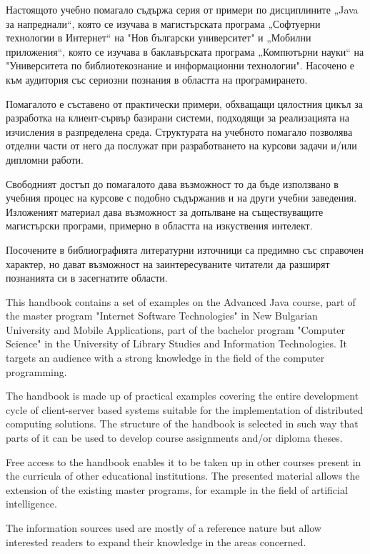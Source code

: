 Настоящото учебно помагало съдържа серия от примери по дисциплините „Java за напреднали“, която се изучава в магистърската програма „Софтуерни технологии в Интернет“ на "Нов български университет" и „Мобилни приложения“, която се изучава в баклавърската програма „Компютърни науки“ на "Университета по библиотекознание и информационни технологии". Насочено е към аудитория със сериозни познания в областта на програмирането. 

Помагалото е съставено от практически примери, обхващащи цялостния цикъл за разработка на клиент-сървър базирани системи, подходящи за реализацията на изчисления в разпределена среда. Структурата на учебното помагало позволява отделни части от него да послужат при разработването на курсови задачи и/или дипломни работи.

Свободният достъп до помагалото дава възможност то да бъде използвано в учебния процес на курсове с подобно съдържанив и на други учебни заведения. Изложеният материал дава възможност за допълване на съществуващите магистърски програми, примерно в областта на изкуствения интелект.

Посочените в библиографията литературни източници са предимно със справочен характер, но дават възможност на заинтересуваните читатели да разширят познанията си в засегнатите области. 

This handbook contains a set of examples on the Advanced Java course, part of the master program "Internet Software Technologies" in New Bulgarian University and Mobile Applications, part of the bachelor program "Computer Science" in the University of Library Studies and Information Technologies. It targets an audience with a strong knowledge in the field of the computer programming.

The handbook is made up of practical examples covering the entire development cycle of client-server based systems suitable for the implementation of distributed computing solutions. The structure of the handbook is selected in such way that parts of it can be used to develop course assignments and/or diploma theses.

Free access to the handbook enables it to be taken up in other courses present in the curricula of other educational institutions. The presented material allows the extension of the existing master programs, for example in the field of artificial intelligence.

The information sources used are mostly of a reference nature but allow interested readers to expand their knowledge in the areas concerned.

